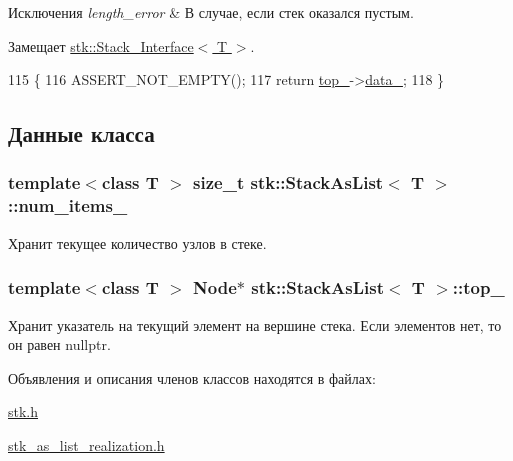 \begin{DoxyExceptions}{Исключения}
{\em length\+\_\+error} & В случае, если стек оказался пустым. \\
\hline
\end{DoxyExceptions}


Замещает \hyperlink{classstk_1_1_stack___interface_a72962a23863f45a8b2b6905144689681}{stk\+::\+Stack\+\_\+\+Interface$<$ T $>$}.


\begin{DoxyCode}
115                           \{
116         ASSERT\_NOT\_EMPTY();
117         \textcolor{keywordflow}{return} \hyperlink{classstk_1_1_stack_as_list_afb5080650911a8b907dd5b383a153239}{top\_}->\hyperlink{structstk_1_1_stack_as_list_1_1_node_a7a634b5814175d7bcdee465da07ca3d4}{data\_};
118     \}
\end{DoxyCode}


\subsection{Данные класса}
\hypertarget{classstk_1_1_stack_as_list_a203bb8328f70a7e5b6eebbc29e71d011}{}
\subsubsection[{num\+\_\+items\+\_\+}]{\setlength{\rightskip}{0pt plus 5cm}template$<$class T $>$ size\+\_\+t {\bf stk\+::\+Stack\+As\+List}$<$ T $>$\+::num\+\_\+items\+\_\+\hspace{0.3cm}{\ttfamily [private]}}\label{classstk_1_1_stack_as_list_a203bb8328f70a7e5b6eebbc29e71d011}


Хранит текущее количество узлов в стеке. 

\hypertarget{classstk_1_1_stack_as_list_afb5080650911a8b907dd5b383a153239}{}
\subsubsection[{top\+\_\+}]{\setlength{\rightskip}{0pt plus 5cm}template$<$class T $>$ {\bf Node}$\ast$ {\bf stk\+::\+Stack\+As\+List}$<$ T $>$\+::top\+\_\+\hspace{0.3cm}{\ttfamily [private]}}\label{classstk_1_1_stack_as_list_afb5080650911a8b907dd5b383a153239}


Хранит указатель на текущий элемент на вершине стека. Если элементов нет, то он равен nullptr. 



Объявления и описания членов классов находятся в файлах\+:\begin{DoxyCompactItemize}
\item 
\hyperlink{stk_8h}{stk.\+h}\item 
\hyperlink{stk__as__list__realization_8h}{stk\+\_\+as\+\_\+list\+\_\+realization.\+h}\end{DoxyCompactItemize}
